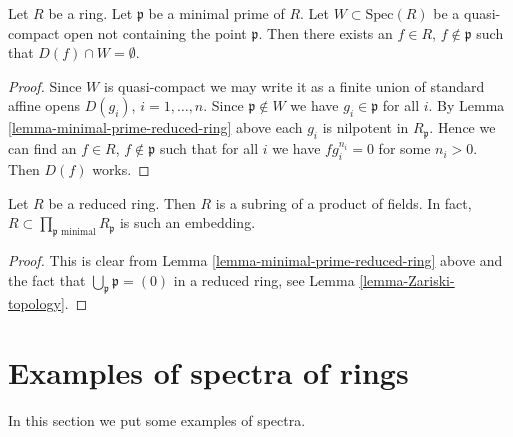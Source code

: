 \begin{lemma}
\label{lemma-standard-open-containing-maximal-point}
Let $R$ be a ring.
Let $\mathfrak p$ be a minimal prime of $R$.
Let $W \subset \text{Spec}(R)$ be a quasi-compact open
not containing the point $\mathfrak p$. Then there
exists an $f \in R$, $f \not \in \mathfrak p$ such
that $D(f) \cap W = \emptyset$.
\end{lemma}

\begin{proof}
Since $W$ is quasi-compact we may write it as a finite union
of standard affine opens $D(g_i)$, $i = 1, \ldots, n$.
Since $\mathfrak p \not \in W$ we have $g_i \in \mathfrak p$ for
all $i$. By Lemma \ref{lemma-minimal-prime-reduced-ring} above
each $g_i$ is nilpotent in $R_{\mathfrak p}$. Hence we can find
an $f \in R$, $f \not \in \mathfrak p$ such that for all $i$ we have
$f g_i^{n_i} = 0$ for some $n_i > 0$. Then $D(f)$ works.
\end{proof}

\begin{lemma}
\label{lemma-reduced-ring-sub-product-fields}
Let $R$ be a reduced ring.
Then $R$ is a subring of a product of fields.
In fact, $R \subset \prod_{\mathfrak p\text{ minimal}} R_{\mathfrak p}$
is such an embedding.
\end{lemma}

\begin{proof}
This is clear from Lemma \ref{lemma-minimal-prime-reduced-ring} above
and the fact that $\bigcup_{\mathfrak p} \mathfrak p = (0)$
in a reduced ring, see Lemma \ref{lemma-Zariski-topology}.
\end{proof}














\section{Examples of spectra of rings}
\label{section-examples-spectra}

\noindent
In this section we put some examples of spectra.

